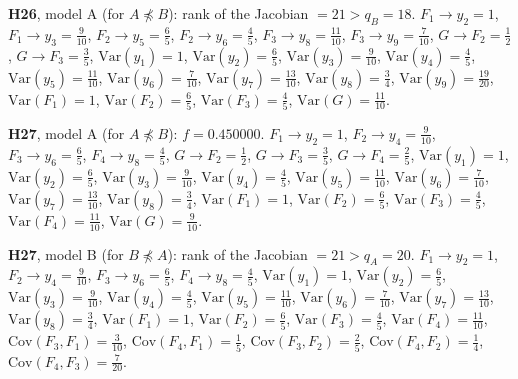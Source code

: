 \documentclass[10pt,a4paper]{article}
\newcommand{\nnest}{\not\preceq}
\begin{document}
{\noindent\textbf{H26}, model A (for $A\nnest B$): rank of the Jacobian $=21>q_B=18$. {\footnotesize $F_{1}\to y_{2}=1$, $F_{1}\to y_{3}=\tfrac{9}{10}$, $F_{2}\to y_{5}=\tfrac{6}{5}$, $F_{2}\to y_{6}=\tfrac{4}{5}$, $F_{3}\to y_{8}=\tfrac{11}{10}$, $F_{3}\to y_{9}=\tfrac{7}{10}$, $G\to F_{2}=\tfrac{1}{2}$, $G\to F_{3}=\tfrac{3}{5}$, $\mathrm{Var}(y_{1})=1$, $\mathrm{Var}(y_{2})=\tfrac{6}{5}$, $\mathrm{Var}(y_{3})=\tfrac{9}{10}$, $\mathrm{Var}(y_{4})=\tfrac{4}{5}$, $\mathrm{Var}(y_{5})=\tfrac{11}{10}$, $\mathrm{Var}(y_{6})=\tfrac{7}{10}$, $\mathrm{Var}(y_{7})=\tfrac{13}{10}$, $\mathrm{Var}(y_{8})=\tfrac{3}{4}$, $\mathrm{Var}(y_{9})=\tfrac{19}{20}$, $\mathrm{Var}(F_{1})=1$, $\mathrm{Var}(F_{2})=\tfrac{6}{5}$, $\mathrm{Var}(F_{3})=\tfrac{4}{5}$, $\mathrm{Var}(G)=\tfrac{11}{10}$.}\par\smallskip
\noindent\textbf{H27}, model A (for $A\nnest B$): $f=0.450000$. {\footnotesize $F_{1}\to y_{2}=1$, $F_{2}\to y_{4}=\tfrac{9}{10}$, $F_{3}\to y_{6}=\tfrac{6}{5}$, $F_{4}\to y_{8}=\tfrac{4}{5}$, $G\to F_{2}=\tfrac{1}{2}$, $G\to F_{3}=\tfrac{3}{5}$, $G\to F_{4}=\tfrac{2}{5}$, $\mathrm{Var}(y_{1})=1$, $\mathrm{Var}(y_{2})=\tfrac{6}{5}$, $\mathrm{Var}(y_{3})=\tfrac{9}{10}$, $\mathrm{Var}(y_{4})=\tfrac{4}{5}$, $\mathrm{Var}(y_{5})=\tfrac{11}{10}$, $\mathrm{Var}(y_{6})=\tfrac{7}{10}$, $\mathrm{Var}(y_{7})=\tfrac{13}{10}$, $\mathrm{Var}(y_{8})=\tfrac{3}{4}$, $\mathrm{Var}(F_{1})=1$, $\mathrm{Var}(F_{2})=\tfrac{6}{5}$, $\mathrm{Var}(F_{3})=\tfrac{4}{5}$, $\mathrm{Var}(F_{4})=\tfrac{11}{10}$, $\mathrm{Var}(G)=\tfrac{9}{10}$.}\par\smallskip
\noindent\textbf{H27}, model B (for $B\nnest A$): rank of the Jacobian $=21>q_A=20$. {\footnotesize $F_{1}\to y_{2}=1$, $F_{2}\to y_{4}=\tfrac{9}{10}$, $F_{3}\to y_{6}=\tfrac{6}{5}$, $F_{4}\to y_{8}=\tfrac{4}{5}$, $\mathrm{Var}(y_{1})=1$, $\mathrm{Var}(y_{2})=\tfrac{6}{5}$, $\mathrm{Var}(y_{3})=\tfrac{9}{10}$, $\mathrm{Var}(y_{4})=\tfrac{4}{5}$, $\mathrm{Var}(y_{5})=\tfrac{11}{10}$, $\mathrm{Var}(y_{6})=\tfrac{7}{10}$, $\mathrm{Var}(y_{7})=\tfrac{13}{10}$, $\mathrm{Var}(y_{8})=\tfrac{3}{4}$, $\mathrm{Var}(F_{1})=1$, $\mathrm{Var}(F_{2})=\tfrac{6}{5}$, $\mathrm{Var}(F_{3})=\tfrac{4}{5}$, $\mathrm{Var}(F_{4})=\tfrac{11}{10}$, $\mathrm{Cov}(F_{3},F_{1})=\tfrac{3}{10}$, $\mathrm{Cov}(F_{4},F_{1})=\tfrac{1}{5}$, $\mathrm{Cov}(F_{3},F_{2})=\tfrac{2}{5}$, $\mathrm{Cov}(F_{4},F_{2})=\tfrac{1}{4}$, $\mathrm{Cov}(F_{4},F_{3})=\tfrac{7}{20}$.}\par\smallskip
}
\end{document}
